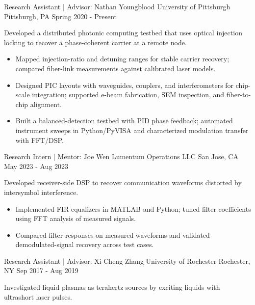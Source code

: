 \newcommand{\projectintro}[1]{#1\par}
\newcommand{\projectentrygap}{\par\nointerlineskip\vspace{-3pt}}
\begin{cventries}
  \setlength{\parskip}{0pt}
  \renewcommand*{\descriptionstyle}[1]{{\fontsize{9.5pt}{12pt}\bodyfontlight\upshape\color{text} #1}}
  \cventry
    {Research Assistant | Advisor: Nathan Youngblood}
    {University of Pittsburgh}
    {Pittsburgh, PA}
    {Spring 2020 - Present}
    {
      \projectintro{Developed a distributed photonic computing testbed that uses optical injection locking to recover a phase-coherent carrier at a remote node.}
      \begin{itemize}[leftmargin=2ex,topsep=2pt]
        \item Mapped injection-ratio and detuning ranges for stable carrier recovery; compared fiber-link measurements against calibrated laser models.
        \item Designed PIC layouts with waveguides, couplers, and interferometers for chip-scale integration; supported e-beam fabrication, SEM inspection, and fiber-to-chip alignment.
        \item Built a balanced-detection testbed with PID phase feedback; automated instrument sweeps in Python/PyVISA and characterized modulation transfer with FFT/DSP.
      \end{itemize}
    }\projectentrygap
  \cventry
    {Research Intern | Mentor: Joe Wen}
    {Lumentum Operations LLC}
    {San Jose, CA}
    {May 2023 - Aug 2023}
    {
      \projectintro{Developed receiver-side DSP to recover communication waveforms distorted by intersymbol interference.}
      \begin{itemize}[leftmargin=2ex,topsep=2pt]
        \item Implemented FIR equalizers in MATLAB and Python; tuned filter coefficients using FFT analysis of measured signals.
        \item Compared filter responses on measured waveforms and validated demodulated-signal recovery across test cases.
      \end{itemize}
    }\projectentrygap
  \cventry
    {Research Assistant | Advisor: Xi-Cheng Zhang}
    {University of Rochester}
    {Rochester, NY}
    {Sep 2017 - Aug 2019}
    {
      \projectintro{Investigated liquid plasmas as terahertz sources by exciting liquids with ultrashort laser pulses.}
      \begin{itemize}[leftmargin=2ex,topsep=2pt]

\end{itemize}}
\end{cventries}
